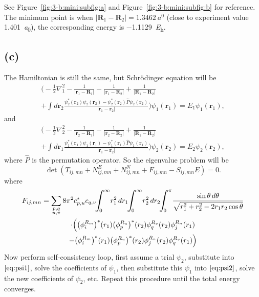 See Figure~\ref{fig:3-b:mini:subfig:a} and Figure~\ref{fig:3-b:mini:subfig:b}
for reference. The minimum point is when
$\lvert \symbf{R}_1- \symbf{R}_2 \rvert = \SI{1.3462}{\bohr}$
(close to experiment value \SI{1.401}{\bohr}), the corresponding energy is \SI{-1.1129}{\hartree}.

\subsection*{(c)}

The Hamiltonian is still the same, but Schrödinger equation will be
%
\begin{multline}\label{eq:psi1}
    \biggl(-\frac{1}{2}\nabla_1^2
    - \frac{1}{\lvert \symbf{r}_1 - \symbf{R}_1 \rvert}
    - \frac{1}{\lvert \symbf{r}_1 - \symbf{R}_2 \rvert}
    + \frac{1}{\lvert \symbf{R}_1 - \symbf{R}_2 \rvert}\\
    + \int d\symbf{r}_2
    \frac{\psi_2^\ast (\symbf{r}_2) \psi_2(\symbf{r}_2) - \psi_2^\ast (\symbf{r}_2) \hat{P} \psi_2(\symbf{r}_2)}{\lvert \symbf{r}_1 - \symbf{r}_2 \rvert}
    \biggr)
    \psi_1(\symbf{r}_1) = E_1 \psi_1(\symbf{r}_1),
\end{multline}
%
and
%
\begin{multline}\label{eq:psi2}
    \biggl(-\frac{1}{2}\nabla_2^2
    - \frac{1}{\lvert \symbf{r}_2 - \symbf{R}_1 \rvert}
    - \frac{1}{\lvert \symbf{r}_2 - \symbf{R}_2 \rvert}
    + \frac{1}{\lvert \symbf{R}_1 - \symbf{R}_2 \rvert}\\
    + \int d\symbf{r}_1
    \frac{\psi_1^\ast (\symbf{r}_1) \psi_1(\symbf{r}_1) - \psi_1^\ast (\symbf{r}_1) \hat{P} \psi_1(\symbf{r}_1)}{\lvert \symbf{r}_1 - \symbf{r}_2 \rvert}
    \biggr)
    \psi_2(\symbf{r}_2) = E_2 \psi_2(\symbf{r}_2),
\end{multline}
%
where $\hat{P}$ is the permutation operator. So the eigenvalue problem will be
%
\begin{equation}
    \det(T_{ij, mn} + N^E_{ij, mn} + N^N_{ij, mn} + F_{ij, mn} - S_{ij, mn} E) = 0.
\end{equation}
%
where
%
\begin{multline}
    F_{ij, mn} = \sum_{\substack{p, q\\u, v}} 8\pi^2 c_{p, u}^\ast c_{q, v}
    \! \scaleint{7ex}_{\bs 0}^{\infty} r_1^2  \, dr_1
    \! \scaleint{7ex}_{\bs 0}^{\infty} r_2^2 \, dr_2
    \! \scaleint{7ex}_{\bs 0}^{\pi}
    \frac{\sin\theta\, d\theta}{\sqrt{r_1^2 + r_2^2 - 2 r_1 r_2 \cos\theta}}\\
    \cdot \Bigl(
    \bigl( \phi_i^{R_m} \bigr)^\ast(r_1) \bigl(\phi_p^{R_u} \bigr)^\ast(r_2) \phi_q^{R_v}(r_2)\phi_j^{R_n}(r_1)\\
    - \bigl( \phi_i^{R_m} \bigr)^\ast(r_1) \bigl(\phi_p^{R_u} \bigr)^\ast(r_2) \phi_j^{R_n}(r_2)\phi_q^{R_v}(r_1)
    \Bigr)
\end{multline}
%
Now perform self-consistency loop, first assume a trial $\psi_2$, substitute into
$\eqref{eq:psi1}$, solve the coefficients of $\psi_1$, then substitute this $\psi_1$
into $\eqref{eq:psi2}$, solve the new coefficients of $\psi_2$, etc. Repeat this procedure
until the total energy converges.

